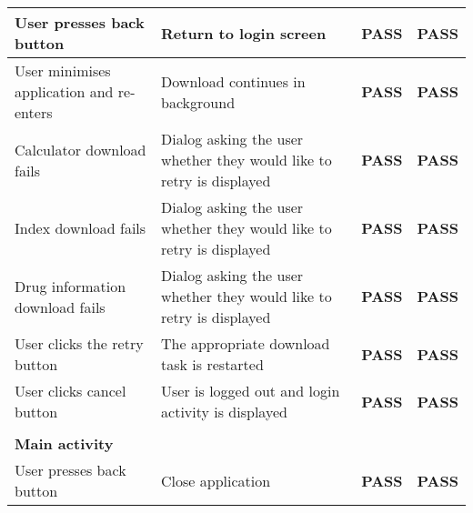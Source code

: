 \documentclass[11pt,fleqn,twoside]{article}
\begin{document}
\begin{center}
\begin{longtable}{| p{5cm} | p{5cm} | c | c |}
User presses back button                                                   & Return to login screen                                                                           & \textbf{PASS}         & \textbf{PASS}          \\ \hline
User minimises application and re-enters                                   & Download continues in background                                                                 & \textbf{PASS}         & \textbf{PASS}          \\ \hline
Calculator download fails                                                  & Dialog asking the user whether they would like to retry is displayed                             & \textbf{PASS}         & \textbf{PASS}          \\ \hline
Index download fails                                                       & Dialog asking the user whether they would like to retry is displayed                             & \textbf{PASS}         & \textbf{PASS}          \\ \hline
Drug information download fails                                            & Dialog asking the user whether they would like to retry is displayed                             & \textbf{PASS}         & \textbf{PASS}          \\ \hline
User clicks the retry button                                               & The appropriate download task is restarted                                                       & \textbf{PASS}         & \textbf{PASS}          \\ \hline
User clicks cancel button                                                  & User is logged out and login activity is displayed                                               & \textbf{PASS}         & \textbf{PASS}          \\ \hline
                                                                           &                                                                                                  & \textbf{}             & \textbf{}              \\ \hline
\textbf{Main activity}                                                     &                                                                                                  & \textbf{}             & \textbf{}              \\ \hline
User presses back button                                                   & Close application                                                                                & \textbf{PASS}         & \textbf{PASS}          \\ \hline

\end{longtable}
\end{center}
\end{document}
